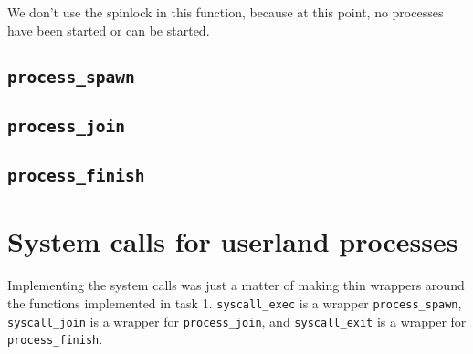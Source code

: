 \documentclass{article}
\begin{document}
We don't use the spinlock in this function, because at this point, no processes have been started or can be started.

\subsection{\texttt{process\_spawn}}
\subsection{\texttt{process\_join}}
\subsection{\texttt{process\_finish}}

\section{System calls for userland processes}
Implementing the system calls was just a matter of making thin wrappers around the functions implemented in task 1. \texttt{syscall\_exec} is a wrapper \texttt{process\_spawn}, \texttt{syscall\_join} is a wrapper for \texttt{process\_join}, and \texttt{syscall\_exit} is a wrapper for \texttt{process\_finish}.
\end{document}
